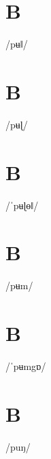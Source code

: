 \documentclass[10pt,a4paper,twoside]{book}
\begin{document}
\section*{B}

\begin{multicols}{3}
 {/pʉǁ/} {}
\end{multicols}

\section*{B}

\begin{multicols}{3}
 {/pʉɭ/} {}
\end{multicols}

\section*{B}

\begin{multicols}{3}
 {/ˈpʉɭɵǁ/} {}
\end{multicols}

\section*{B}

\begin{multicols}{3}
 {/pʉm/} {}
\end{multicols}

\section*{B}

\begin{multicols}{3}
 {/ˈpʉmgɒ/} {}
\end{multicols}

\section*{B}

\begin{multicols}{3}
 {/puŋ/} {}
\end{multicols}
\end{document}
